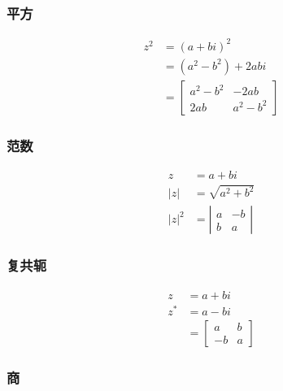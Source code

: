 \subsubsection*{平方}
$$
\begin{aligned}
z^{2} & =(a+b i)^{2} \\
& =\left(a^{2}-b^{2}\right)+2 a b i \\
& =\left[\begin{array}{cc}
a^{2}-b^{2} & -2 a b \\
2 a b & a^{2}-b^{2}
\end{array}\right]
\end{aligned}
$$

\subsubsection*{范数}

$$
\begin{aligned}
z & =a+b i \\
|z| & =\sqrt{a^{2}+b^{2}} \\
|z|^{2} & =\left|\begin{array}{cc}
a & -b \\
b & a
\end{array}\right|
\end{aligned}
$$

\subsubsection*{复共轭}

$$
\begin{aligned}
z & =a+b i \\
z^{*} & =a-b i \\
& =\left[\begin{array}{cc}
a & b \\
-b & a
\end{array}\right]
\end{aligned}
$$

\subsubsection*{商}

